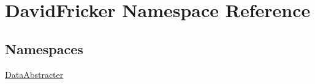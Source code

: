 \hypertarget{namespace_david_fricker}{}\section{David\+Fricker Namespace Reference}
\label{namespace_david_fricker}
\subsection*{Namespaces}
\begin{DoxyCompactItemize}
\item 
 \hyperlink{namespace_david_fricker_1_1_data_abstracter}{Data\+Abstracter}
\end{DoxyCompactItemize}
